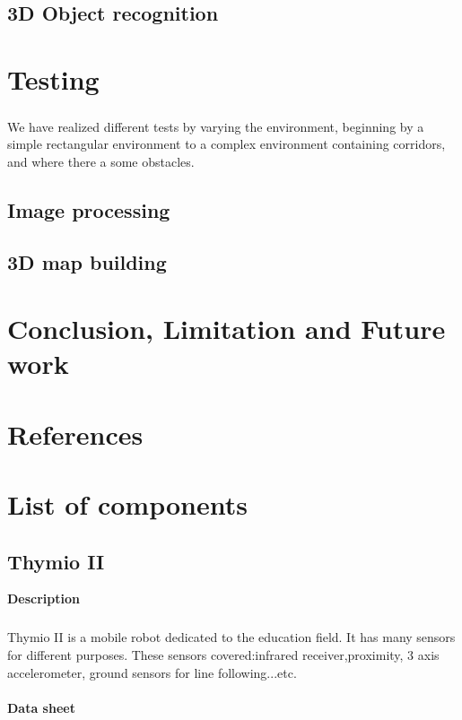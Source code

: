 \documentclass[12pt]{report}
\begin{document}
	\section{3D Object recognition}

	\chapter{Testing}
	\paragraph{}
	We have realized different tests by varying the environment, beginning by a simple rectangular environment to a complex environment containing corridors, and where there a some obstacles. 
	
	\section{Image processing}
	
	\section{3D map building}
	
	\chapter{Conclusion, Limitation and Future work}
	\chapter{References}


	\appendix
	\chapter{List of components}
	\section{Thymio II}
	\textbf{Description} 
	\paragraph{}
	Thymio II is a mobile robot dedicated to the education field. It has many sensors for different purposes. These sensors covered:infrared receiver,proximity, 3 axis accelerometer, ground sensors for line following...etc.
	\\ \\
	\textbf{Data sheet} 
\end{document}

